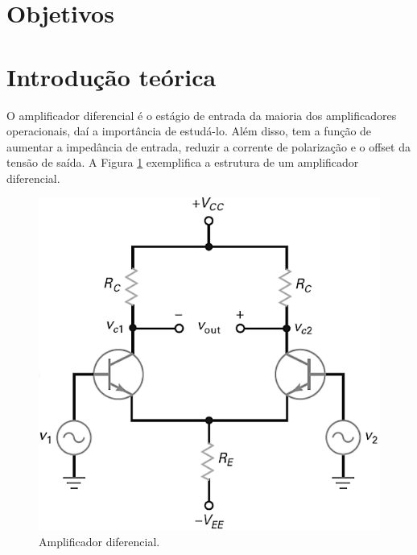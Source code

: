 \documentclass[a4paper,12pt,oneside,openany,table,xcdraw]{article}
\begin{document}
\newcommand{\thedepartment}{Faculdade de Engenharia Elétrica}
\newcommand{\thecourse}{FEELT}
\newcommand{\thetitle}{AMPLIFICADOR DIFERENCIAL}
\newcommand{\thetype}{Relatório da Disciplina de Eletrônica Analógica II}
\newcommand{\theproftitle}{Bacharel em Engenharia Elétrica}
\newcommand{\thestudent}{Lesly Viviane Montúfar Berrios\\
\centering11811ETE001}
\newcommand{\theadvisor}{Prof. Gustavo Brito de Lima}
\newcommand{\thecity}{Uberlândia}

\thispagestyle{empty}


\onehalfspacing
\tableofcontents %
\newpage

\section{Objetivos} %


\section{Introdução teórica} 


O amplificador diferencial é o estágio de entrada da maioria dos amplificadores operacionais, daí a importância de estudá-lo. Além disso, tem a função de aumentar a impedância de entrada, reduzir a corrente de polarização e o offset da tensão de saída. A Figura \ref{intro:amp-dif} exemplifica a estrutura de um amplificador diferencial.

\vspace{0.5cm}
\begin{figure}[H]
\centering
\includegraphics[width=13cm]{amp-dif}
\caption{Amplificador diferencial.}
\label{intro:amp-dif}
\end{figure}
\vspace{0.5cm}
\end{document}
